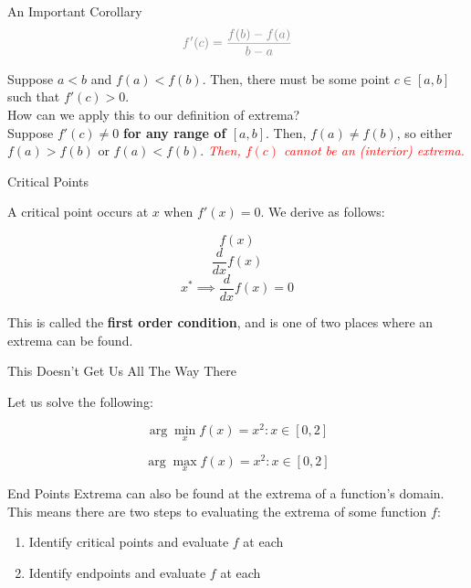 \documentclass[10pt]{beamer}
\begin{document}
\begin{frame}{An Important Corollary}
    \vspace{-1cm}
    \[\textcolor{gray}{f'(c) = \frac{f(b)-f(a)}{b-a}}\]
    
    Suppose $a < b$ and $f(a) < f(b)$. Then, there must be some point $c \in [a,b]$ such that $f'(c) > 0$. \\
    \vspace{1cm}
    How can we apply this to our definition of extrema?\\
    \pause
    \vspace{1cm}
    Suppose $f'(c) \neq 0$ \textbf{for any range of $[a,b]$}. Then, $f(a) \neq f(b)$, so either $f(a) > f(b)$ or $f(a) < f(b)$. \textit{\textcolor{red}{Then, $f(c)$ cannot be an (interior) extrema.}}

\end{frame}

\begin{frame}{Critical Points}

A critical point occurs at $x$ when $f'(x) = 0$. We derive as follows:

\[f(x)\]
\[\frac{d}{dx} f(x)\]
\[x^* \implies\frac{d}{dx} f(x) = 0\]

This is called the \textbf{first order condition}, and is one of two places where an extrema can be found.
    
\end{frame}

\begin{frame}{This Doesn't Get Us All The Way There}

Let us solve the following:

\[\arg\min_x f(x) = x^2: x \in [0,2]\]

\[\arg\max_x f(x) = x^2: x \in [0,2]\]
    
\end{frame}

\begin{frame}{End Points}
    Extrema can also be found at the extrema of a function's domain. \\
    \vspace{1cm}
    This means there are two steps to evaluating the extrema of some function $f$:
    \begin{enumerate}
        \item Identify critical points and evaluate $f$ at each
        \item Identify endpoints and evaluate $f$ at each
    \end{enumerate}
\end{frame}
\end{document}
